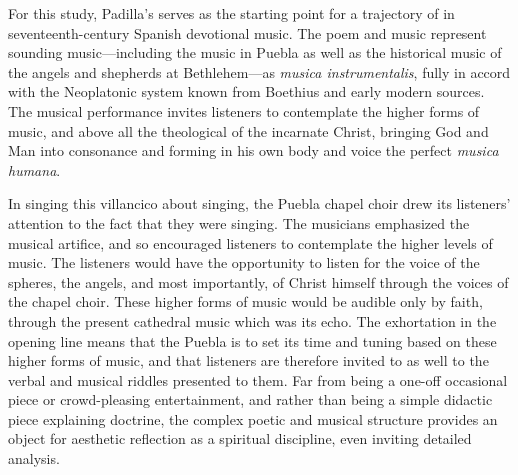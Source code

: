 For this study, Padilla's  serves as the starting point for a
trajectory of  in seventeenth-century Spanish
devotional music.
The poem and music represent sounding music---including the 
music in Puebla as well as the historical music of the angels and shepherds at
Bethlehem---as \emph{musica instrumentalis}, fully in accord with the
Neoplatonic system known from Boethius and early modern sources.
The musical performance invites listeners to contemplate the higher forms of
music, and above all the theological  of the incarnate Christ,
bringing God and Man into consonance and forming in his own body and voice the
perfect \emph{musica humana}.

In singing this villancico about singing, the Puebla chapel choir drew its
listeners' attention to the fact that they were singing.
The musicians emphasized the musical artifice, and so encouraged listeners to
contemplate the higher levels of music.
The listeners would have the opportunity to listen for the voice of the spheres,
the angels, and most importantly, of Christ himself through the voices of the
chapel choir.
These higher forms of music would be audible only by faith, through the present
cathedral music which was its echo.
The exhortation in the opening line means that the Puebla 
is to set its time and tuning based on these higher forms of music, and that
listeners are therefore invited to  as well to the verbal
and musical riddles presented to them.
Far from being a one-off occasional piece or crowd-pleasing entertainment, and
rather than being a simple didactic piece explaining doctrine, the complex
poetic and musical structure provides an object for aesthetic reflection as a
spiritual discipline, even inviting detailed analysis.

